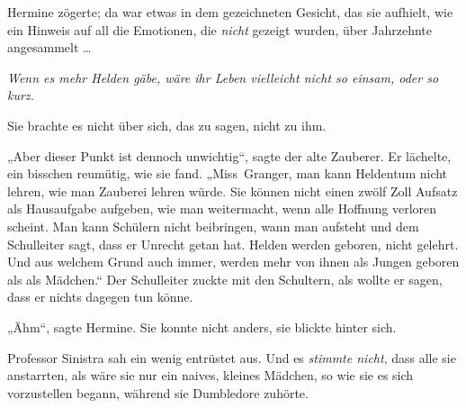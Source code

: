 Hermine zögerte; da war etwas in dem gezeichneten Gesicht, das sie aufhielt, wie ein Hinweis auf all die Emotionen, die \emph{nicht} gezeigt wurden, über Jahrzehnte angesammelt …

\emph{Wenn es mehr Helden gäbe, wäre ihr Leben vielleicht nicht so einsam, oder so kurz.}

Sie brachte es nicht über sich, das zu sagen, nicht zu ihm.

„Aber dieser Punkt ist dennoch unwichtig“, sagte der alte Zauberer. Er lächelte, ein bisschen reumütig, wie sie fand.
„Miss~Granger, man kann Heldentum nicht lehren, wie man Zauberei lehren würde. Sie können nicht einen zwölf Zoll Aufsatz als Hausaufgabe aufgeben, wie man weitermacht, wenn alle Hoffnung verloren scheint. Man kann Schülern nicht beibringen, wann man aufsteht und dem Schulleiter sagt, dass er Unrecht getan hat. Helden werden geboren, nicht gelehrt. Und aus welchem Grund auch immer, werden mehr von ihnen als Jungen geboren als als Mädchen.“ Der Schulleiter zuckte mit den Schultern, als wollte er sagen, dass er nichts dagegen tun könne.

„Ähm“, sagte Hermine. Sie konnte nicht anders, sie blickte hinter sich.

Professor Sinistra sah ein wenig entrüstet aus. Und es \emph{stimmte nicht}, dass alle sie anstarrten, als wäre sie nur ein naives, kleines Mädchen, so wie sie es sich vorzustellen begann, während sie Dumbledore zuhörte.

